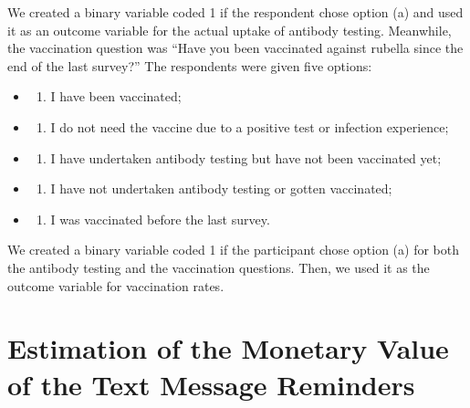 \documentclass[
    a4paper
]{article}
\providecommand{\tightlist}{%
  \setlength{\itemsep}{0pt}\setlength{\parskip}{0pt}}
\begin{document}
We created a binary variable coded 1 if the respondent chose option (a) and used it as an outcome variable for the actual uptake of antibody testing. Meanwhile, the vaccination question was ``Have you been vaccinated against rubella since the end of the last survey?'' The respondents were given five options:

\begin{itemize}
\item
  \begin{enumerate}
  \def\labelenumi{(\alph{enumi})}
  \tightlist
  \item
    I have been vaccinated;
  \end{enumerate}
\item
  \begin{enumerate}
  \def\labelenumi{(\alph{enumi})}
  \setcounter{enumi}{1}
  \tightlist
  \item
    I do not need the vaccine due to a positive test or infection experience;
  \end{enumerate}
\item
  \begin{enumerate}
  \def\labelenumi{(\alph{enumi})}
  \setcounter{enumi}{2}
  \tightlist
  \item
    I have undertaken antibody testing but have not been vaccinated yet;
  \end{enumerate}
\item
  \begin{enumerate}
  \def\labelenumi{(\alph{enumi})}
  \setcounter{enumi}{3}
  \tightlist
  \item
    I have not undertaken antibody testing or gotten vaccinated;
  \end{enumerate}
\item
  \begin{enumerate}
  \def\labelenumi{(\alph{enumi})}
  \setcounter{enumi}{4}
  \tightlist
  \item
    I was vaccinated before the last survey.
  \end{enumerate}
\end{itemize}

We created a binary variable coded 1 if the participant chose option (a) for both the antibody testing and the vaccination questions. Then, we used it as the outcome variable for vaccination rates.

\clearpage

\hypertarget{method-value}{%
\section{Estimation of the Monetary Value of the Text Message Reminders}\label{method-value}}
\end{document}
